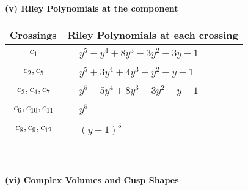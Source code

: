 \documentclass[1p]{elsarticle_modified}
\theoremstyle{definition}
\begin{document}
\newpage\renewcommand{\arraystretch}{1}
\flushleft \textbf{(v) Riley Polynomials at the component}\newline \\
\begin{tabular}{m{50pt}|m{274pt}}
Crossings & \hspace{64pt}Riley Polynomials at each crossing \\
\hline $$\begin{aligned}c_{1}\end{aligned}$$&$\begin{aligned}
&y^5- y^4+8 y^3-3 y^2+3 y-1
\end{aligned}$\\
\hline $$\begin{aligned}c_{2},c_{5}\end{aligned}$$&$\begin{aligned}
&y^5+3 y^4+4 y^3+y^2- y-1
\end{aligned}$\\
\hline $$\begin{aligned}c_{3},c_{4},c_{7}\end{aligned}$$&$\begin{aligned}
&y^5-5 y^4+8 y^3-3 y^2- y-1
\end{aligned}$\\
\hline $$\begin{aligned}c_{6},c_{10},c_{11}\end{aligned}$$&$\begin{aligned}
&y^5
\end{aligned}$\\
\hline $$\begin{aligned}c_{8},c_{9},c_{12}\end{aligned}$$&$\begin{aligned}
&(y-1)^5
\end{aligned}$\\
\hline
\end{tabular}\\~\\
\newpage\flushleft \textbf{(vi) Complex Volumes and Cusp Shapes}
\end{document}
